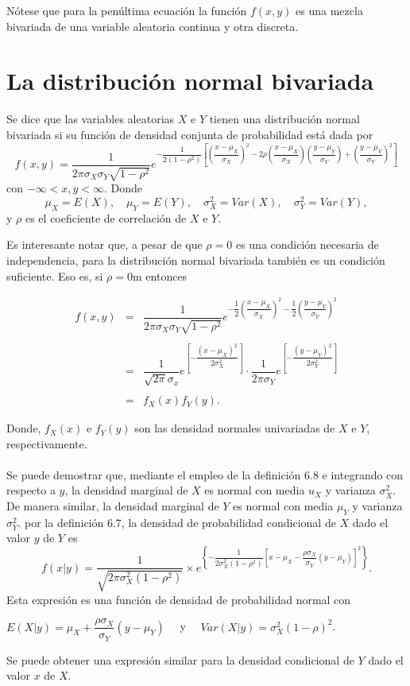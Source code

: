 Nótese que para la penúltima ecuación la función $f(x,y)$ es una mezcla bivariada de una variable aleatoria continua y otra discreta.


\section{La distribución normal bivariada}

\begin{def.}
    Se dice que las variables aleatorias $X$ e $Y$ tienen una distribución normal bivariada si su función de densidad conjunta de probabilidad está dada por
    $$f(x,y)=\dfrac{1}{2\pi\sigma_X \sigma_Y\sqrt{1-\rho^2}}e^{-\dfrac{1}{2(1-\rho^2)}\left[\left(\dfrac{x-\mu_X}{\sigma_X}\right)^2-2\rho \left(\dfrac{x-\mu_X}{\sigma_X}\right)\left(\dfrac{y-\mu_Y}{\sigma_Y}\right)+\left(\dfrac{y-\mu_Y}{\sigma_Y}\right)^2\right]}$$
    con $-\infty < x,y<\infty$. Donde
    $$\mu_X = E(X),\quad \mu_Y=E(Y),\quad \sigma_X^2 = Var(X),\quad \sigma_Y^2 = Var(Y),$$
    y $\rho$ es el coeficiente de correlación de $X$ e $Y$.
\end{def.}

Es interesante notar que, a pesar de que $\rho=0$ es una condición necesaria de independencia, para la distribución normal bivariada también es un condición suficiente. Eso es, si $\rho=0$m entonces
\begin{tcolorbox}
    $$\begin{array}{rcl}
	f(x,y)&=&\dfrac{1}{2\pi\sigma_X \sigma_Y\sqrt{1-\rho^2}}e^{-\dfrac{1}{2}\left(\dfrac{x-\mu_X}{\sigma_X}\right)^2-\dfrac{1}{2}\left(\dfrac{y-\mu_Y}{\sigma_Y}\right)^2}\\\\
	      &=&\dfrac{1}{\sqrt{2\pi}\sigma_x} e^{\left[-\dfrac{(x-\mu_X)^2}{2\sigma^2_X}\right]}\cdot \dfrac{1}{2\pi\sigma_Y} e^{\left[-\dfrac{(y-\mu_Y)^2}{2\sigma^2_Y}\right]}\\\\
	      &=&f_X(x)f_Y(y).
    \end{array}$$
\end{tcolorbox}

Donde, $f_X(x)$ e $f_Y(y)$ son las  densidad normales univariadas de $X$ e $Y$, respectivamente.\\\\

Se puede demostrar que, mediante el empleo de la definición 6.8 e integrando con respecto a $y$, la densidad marginal de $X$ es normal con media $u_X$ y varianza $\sigma_X^2$. De manera similar, la densidad marginal de $Y$ es normal con media $\mu_Y$ y varianza $\sigma_Y^2$. por la definición 6.7, la densidad de probabilidad condicional de $X$ dado el valor $y$ de $Y$ es
$$f(x|y) = \dfrac{1}{\sqrt{2\pi \sigma_X^2(1-\rho^2)}}\times e^{\left\{-\dfrac{1}{2\sigma_X^2(1-\rho^2)}\left[x-\mu_X - \dfrac{\rho \sigma_X}{\sigma_Y}(y-\mu_Y)\right]^2\right\}}.$$
Esta expresión es una función de densidad de probabilidad normal con 
\begin{center}
    $E(X|y)=\mu_X + \dfrac{\rho \sigma_X}{\sigma_Y}(y-\mu_Y)\quad $ y $\quad Var(X|y)=\sigma_X^2(1-\rho)^2$. 
\end{center}

Se puede obtener una expresión similar para la densidad condicional de $Y$ dado el valor $x$ de $X$.



